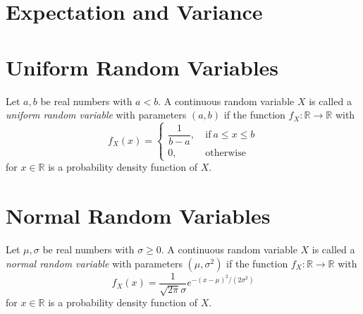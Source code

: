 \section{Expectation and Variance}

\section{Uniform Random Variables}
\begin{definition}
  Let $a, b$ be real numbers with $a < b$.
  A continuous random variable $X$ is called a \emph{uniform random variable}
  with parameters $(a, b)$ if the function $f_X: \mathbb{R} \to \mathbb{R}$
  with
  \begin{equation*}
    f_X(x) = \left\{
    \begin{array}{ll}
      \dfrac{1}{b-a}, &\ \text{if}\ a \leq x \leq b \\[1em]
      0,              &\ \text{otherwise}
    \end{array}
    \right.
  \end{equation*}
  for $x \in \mathbb{R}$ is a probability density function of $X$.
\end{definition}

\section{Normal Random Variables}
\begin{definition}
  Let $\mu, \sigma$ be real numbers with $\sigma \geq 0$.
  A continuous random variable $X$ is called a \emph{normal random variable}
  with parameters $(\mu, \sigma^2)$ if the function
  $f_X: \mathbb{R} \to \mathbb{R}$ with
  \begin{equation*}
    f_X(x) = \frac{1}{\sqrt{2\pi}\sigma}e^{-(x-\mu)^2/(2\sigma^2)}
  \end{equation*}
  for $x \in \mathbb{R}$ is a probability density function of $X$.
\end{definition}